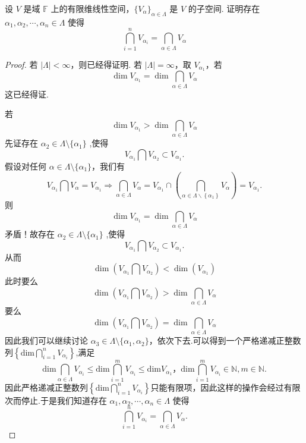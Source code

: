 \documentclass[../../main.tex]{subfiles}%
\begin{document}
\begin{proposition}\label{proposition:无穷多个线性子空间的交等于有限个的交}
设 \( V \) 是域 \( \mathbb{F} \) 上的有限维线性空间，\(\{V_{\alpha}\}_{\alpha \in \Lambda}\) 是 \( V \) 的子空间. 证明存在 \(\alpha_1, \alpha_2, \cdots, \alpha_n \in \Lambda\) 使得
\[
\bigcap_{i = 1}^n V_{\alpha_i} = \bigcap_{\alpha \in \Lambda} V_{\alpha}
\]
\end{proposition}
\begin{proof}

若 \(|\Lambda| < \infty\)，则已经得证明. 若 \(|\Lambda| = \infty\)，取 \(V_{\alpha_1}\)，若
\[
\dim V_{\alpha_1} = \dim \bigcap_{\alpha \in \Lambda} V_{\alpha}
\]
这已经得证.

若
\[
\dim V_{\alpha_1} > \dim \bigcap_{\alpha \in \Lambda} V_{\alpha}
\]
先证存在 \(\alpha_2 \in \Lambda \setminus \{\alpha_1\}\) ,使得
\[
V_{\alpha_1} \bigcap V_{\alpha_2} \subset V_{\alpha_1}.
\]
假设对任何 \(\alpha \in \Lambda \setminus \{\alpha_1\}\)，我们有
\[
V_{\alpha_1} \bigcap V_{\alpha} = V_{\alpha_1}\Longrightarrow \bigcap_{\alpha \in \Lambda}{V_{\alpha}}=V_{\alpha _1}\cap \left( \bigcap_{\alpha \in \Lambda \backslash \left\{ \alpha _1 \right\}}{V_{\alpha}} \right) =V_{\alpha _1}.
\]
则
\[
\dim V_{\alpha_1} = \dim \bigcap_{\alpha \in \Lambda} V_{\alpha}
\]
矛盾！故存在 \(\alpha_2 \in \Lambda \setminus \{\alpha_1\}\) ,使得
\[
V_{\alpha_1} \bigcap V_{\alpha_2} \subset V_{\alpha_1}.
\]
从而
\[
\dim \left( V_{\alpha_1} \bigcap V_{\alpha_2} \right) < \dim \left( V_{\alpha_1} \right)
\]
此时要么
\[
\dim \left( V_{\alpha_1} \bigcap V_{\alpha_2} \right) > \dim \bigcap_{\alpha \in \Lambda} V_{\alpha}
\]
要么
\[
\dim \left( V_{\alpha_1} \bigcap V_{\alpha_2} \right) = \dim \bigcap_{\alpha \in \Lambda} V_{\alpha}
\]
因此我们可以继续讨论 \(\alpha_3 \in \Lambda \setminus \{\alpha_1, \alpha_2\}\)，依次下去.可以得到一个严格递减正整数列$\left\{ \mathrm{dim}\bigcap_{i=1}^n{V_{\alpha _i}} \right\} $,满足
\[
\mathrm{dim}\bigcap_{\alpha \in \Lambda}{V_{\alpha _i}}\leqslant \mathrm{dim}\bigcap_{i=1}^m{V_{\alpha _i}}\leqslant \mathrm{dim}V_{\alpha _1}，\mathrm{dim}\bigcap_{i=1}^m{V_{\alpha _i}}\in \mathbb{N},m\in \mathbb{N}.
\]
因此严格递减正整数列$\left\{ \mathrm{dim}\bigcap_{i=1}^n{V_{\alpha _i}} \right\}$只能有限项，因此这样的操作会经过有限次而停止.于是我们知道存在 \(\alpha_1, \alpha_2, \cdots, \alpha_n \in \Lambda\) 使得
\[
\bigcap_{i = 1}^n V_{\alpha_i} = \bigcap_{\alpha \in \Lambda} V_{\alpha}.
\]

\end{proof}
\end{document}
